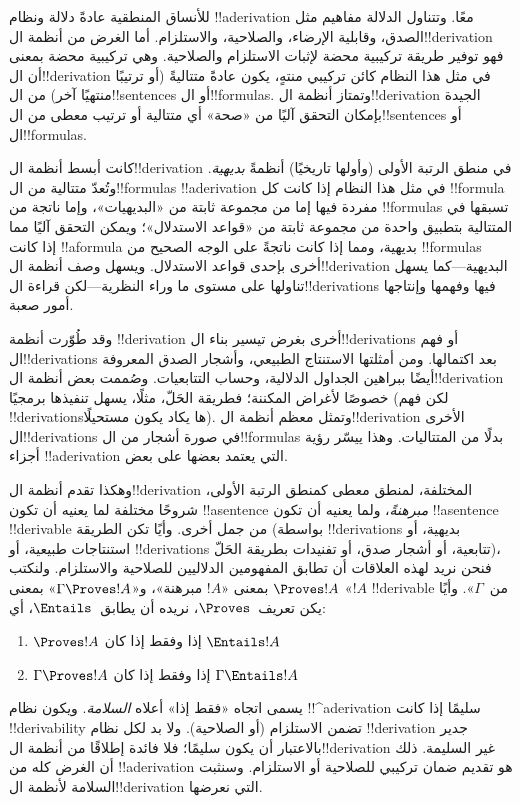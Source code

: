 \documentclass[../../../include/open-logic-section]{subfiles}
\begin{document}
      {}
      {}


للأنساق المنطقية عادةً دلالة ونظام !!a{derivation} معًا. وتتناول
الدلالة مفاهيم مثل الصدق، وقابلية الإرضاء، والصلاحية، والاستلزام. أما
الغرض من أنظمة ال!!{derivation} فهو توفير طريقة تركيبية محضة لإثبات
الاستلزام والصلاحية. وهي تركيبية محضة بمعنى أن ال!!{derivation} في
مثل هذا النظام كائن تركيبي منتهٍ، يكون عادةً متتاليةً (أو ترتيبًا
منتهيًا آخر) من ال!!{sentence}s أو ال!!{formula}s. وتمتاز أنظمة
ال!!{derivation} الجيدة بإمكان التحقق آليًا من «صحة» أي متتالية أو
ترتيب معطى من ال!!{sentence}s أو ال!!{formula}s.

كانت أبسط أنظمة ال!!{derivation} في منطق الرتبة الأولى (وأولها
تاريخيًا) أنظمةً \emph{بديهية}. وتُعدّ متتالية من ال!!{formula}s
!!a{derivation} في مثل هذا النظام إذا كانت كل !!{formula} مفردة فيها
إما من مجموعة ثابتة من «البديهيات»، وإما ناتجة من !!{formula}s تسبقها
في المتتالية بتطبيق واحدة من مجموعة ثابتة من «قواعد الاستدلال»؛ ويمكن
التحقق آليًا مما إذا كانت !!a{formula} بديهية، ومما إذا كانت ناتجةً
على الوجه الصحيح من !!{formula}s أخرى بإحدى قواعد الاستدلال. ويسهل
وصف أنظمة ال!!{derivation} البديهية---كما يسهل تناولها على مستوى ما
وراء النظرية---لكن قراءة ال!!{derivation}s فيها وفهمها وإنتاجها أمور
صعبة.

وقد طُوّرت أنظمة !!{derivation} أخرى بغرض تيسير بناء
ال!!{derivation}s أو فهم ال!!{derivation}s بعد اكتمالها. ومن أمثلتها الاستنتاج
الطبيعي، وأشجار الصدق المعروفة أيضًا ببراهين الجداول الدلالية، وحساب
التتابعيات. وصُممت بعض أنظمة ال!!{derivation} خصوصًا لأغراض المكننة؛
فطريقة الحَلّ، مثلًا، يسهل تنفيذها برمجيًا (لكن فهم
!!{derivation}sها يكاد يكون مستحيلًا). وتمثل معظم أنظمة ال!!{derivation}
الأخرى ال!!{derivation}s في صورة أشجار من ال!!{formula}s بدلًا من
المتتاليات. وهذا ييسّر رؤية أجزاء !!a{derivation} التي يعتمد بعضها
على بعض.

وهكذا تقدم أنظمة ال!!{derivation} المختلفة، لمنطق معطى كمنطق الرتبة
الأولى، شروحًا مختلفة لما يعنيه أن تكون !!a{sentence}
\emph{مبرهنةً}، ولما يعنيه أن تكون !!a{sentence} !!{derivable} من
جمل أخرى. وأيًا تكن الطريقة (بواسطة !!{derivation}s بديهية، أو
استنتاجات طبيعية، أو !!{derivation}s تتابعية، أو أشجار صدق، أو
تفنيدات بطريقة الحَلّ)، فنحن نريد لهذه العلاقات أن تطابق المفهومين
الدلاليين للصلاحية والاستلزام. ولنكتب $\Proves !A$ بمعنى «$!A$ مبرهنة»،
و«$\Gamma \Proves !A$» بمعنى «$!A$ !!{derivable} من~$\Gamma$».
وأيًا يكن تعريف~$\Proves$، نريده أن يطابق~$\Entails$، أي:
\begin{enumerate}
\item $\Proves !A$ إذا وفقط إذا كان $\Entails !A$
\item $\Gamma \Proves !A$ إذا وفقط إذا كان $\Gamma \Entails !A$
\end{enumerate}
يسمى اتجاه «فقط إذا» أعلاه \emph{السلامة}. ويكون نظام
!!^a{derivation} سليمًا إذا كانت !!{derivability} تضمن الاستلزام (أو
الصلاحية). ولا بد لكل نظام !!{derivation} جدير بالاعتبار أن يكون
سليمًا؛ فلا فائدة إطلاقًا من أنظمة ال!!{derivation} غير السليمة. ذلك
أن الغرض كله من !!a{derivation} هو تقديم ضمان تركيبي للصلاحية أو
الاستلزام. وسنثبت السلامة لأنظمة ال!!{derivation} التي نعرضها.
\end{document}
